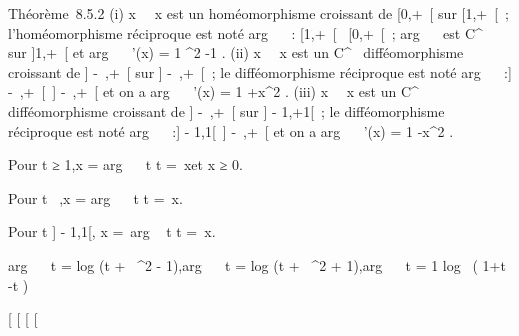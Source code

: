 \documentclass[]{article}
\begin{document}
Théorème~8.5.2 (i)
x\mapsto~\mathrmch~
x est un homéomorphisme croissant de [0,+\infty~[ sur [1,+\infty~[~;
l'homéomorphisme réciproque est noté arg~
\mathrmch~ : [1,+\infty~[\rightarrow~
[0,+\infty~[~; arg~
\mathrmch~ est
C^\infty~ sur ]1,+\infty~[ et arg~
\mathrmch~ '(x) = 1
\over \sqrtx^2  -1 . (ii)
x\mapsto~\mathrmsh~
x est un C^\infty~ difféomorphisme croissant de ] -\infty~,+\infty~[ sur
] -\infty~,+\infty~[~; le difféomorphisme réciproque est noté
arg~
\mathrmsh~ :] -\infty~,+\infty~[\rightarrow~]
-\infty~,+\infty~[ et on a arg~
\mathrmsh~ '(x) = 1
\over {}+x^2 . (iii)
x\mapsto~\mathrmth~
x est un C^\infty~ difféomorphisme croissant de ] -\infty~,+\infty~[ sur
] - 1,+1[~; le difféomorphisme réciproque est noté
arg~
\mathrmth~ :] - 1,1[\rightarrow~]
-\infty~,+\infty~[ et on a arg~
\mathrmth~ '(x) = 1
-x^2 .

Pour t ≥ 1,\quad x = arg~
\mathrmch~ t
\Leftrightarrow t =\
\mathrmch x\text et x ≥ 0.

Pour t \in {}~,\quad x = arg~
\mathrmsh~ t
\Leftrightarrow t =\
\mathrmsh x.

Pour t \in] - 1,1[, \quad x =\
arg \mathrmth~ t
\Leftrightarrow t =\
\mathrmth x.

arg~
\mathrmch~ t
= log (t + \sqrtt~^2
 - 1),\quad arg~
\mathrmsh~ t
= log (t + \sqrtt~^2
 + 1),\quad arg~
\mathrmth~ t = 1
\over 2  log~ ( 1+t
\over 1-t )

[
[
[
[
\end{document}
